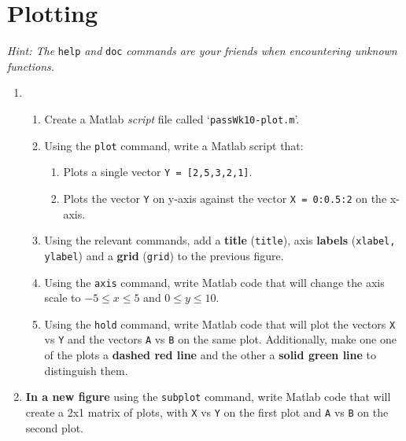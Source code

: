 \documentclass{pass}
\begin{document}
\section*{Plotting}
\textit{Hint: The} \texttt{help} \textit{and} \texttt{doc} \textit{commands are your friends when encountering unknown functions.}
\begin{enumerate}[resume]
	\item 
	\begin{enumerate}
		\item Create a Matlab \textit{script} file called `\texttt{passWk10-plot.m}'.\\
		
		\item Using the \texttt{plot} command, write a Matlab script that:
		\begin{enumerate}
			\item Plots a single vector \texttt{Y = [2,5,3,2,1]}.
			\item Plots the vector \texttt{Y} on y-axis against the vector \texttt{X = 0:0.5:2} on the x-axis.\\
		\end{enumerate}
		
		\item Using the relevant commands, add a \textbf{title} (\texttt{title}), axis \textbf{labels} (\texttt{xlabel, ylabel}) and a \textbf{grid} (\texttt{grid}) to the previous figure.\\
		
		\item Using the \texttt{axis} command, write Matlab code that will change the axis scale to $-5 \leq x \leq 5$ and $0 \leq y \leq 10$.\\
		
		\item Using the \texttt{hold} command, write Matlab code that will plot the vectors \texttt{X} vs \texttt{Y} and the vectors \texttt{A} vs \texttt{B} on the same plot. Additionally, make one one of the plots a \textbf{dashed red line} and the other a \textbf{solid green line} to distinguish them.\\
		
	\end{enumerate}
	\item \textbf{In a new figure} using the \texttt{subplot} command, write Matlab code that will create a 2x1 matrix of plots, with \texttt{X} vs \texttt{Y} on the first plot and \texttt{A} vs \texttt{B} on the second plot.
\end{enumerate}
\end{document}
